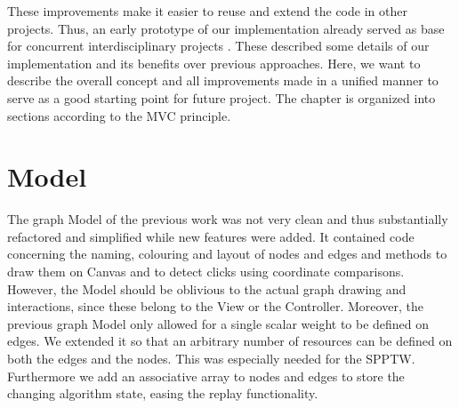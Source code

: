 %

These improvements make it easier to reuse and extend the code in other projects. Thus, an early prototype of our implementation already served as base for concurrent interdisciplinary projects \cite{fischer2016idp,feil2016idp}. These described some details of our implementation and its benefits over previous approaches. Here, we want to describe the overall concept and all improvements made in a unified manner to serve as a good starting point for future project. The chapter is organized into sections according to the MVC principle.

\section{Model}
The graph Model of the previous work was not very clean and thus substantially refactored and simplified while new features were added. It contained code concerning the naming, colouring and layout of nodes and edges and methods to draw them on Canvas and to detect clicks using coordinate comparisons. However, the Model should be oblivious to the actual graph drawing and interactions, since these belong to the View or the Controller. Moreover, the previous graph Model only allowed for a single scalar weight to be defined on edges. We extended it so that an arbitrary number of resources can be defined on both the edges and the nodes. This was especially needed for the SPPTW. Furthermore we add an associative array to nodes and edges to store the changing algorithm state, easing the replay functionality.

